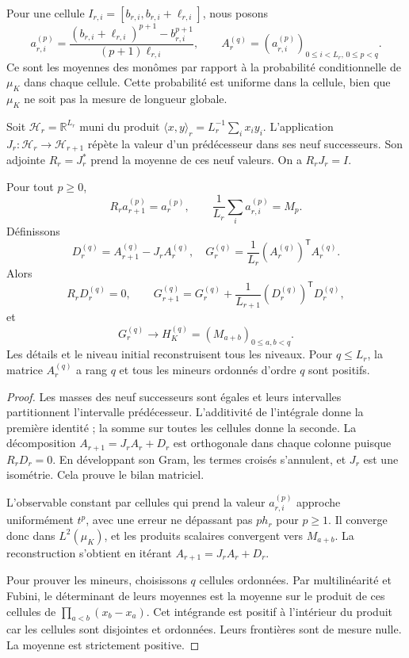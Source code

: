Pour une cellule \(I_{r,i}=[b_{r,i},b_{r,i}+\ell_{r,i}]\), nous posons
\[
 a_{r,i}^{(p)}=
 \frac{(b_{r,i}+\ell_{r,i})^{p+1}-b_{r,i}^{p+1}}
 {(p+1)\ell_{r,i}},\qquad
 A_r^{(q)}=(a_{r,i}^{(p)})_{0\leq i<L_r,\,0\leq p<q}.
\]
Ce sont les moyennes des monômes par rapport à la probabilité conditionnelle
de \(\mu_K\) dans chaque cellule. Cette probabilité est uniforme dans la
cellule, bien que \(\mu_K\) ne soit pas la mesure de longueur globale.

Soit \(\mathcal H_r=\mathbb R^{L_r}\) muni du produit \(\langle x,y\rangle_r=L_r^{-1}\sum_i x_i y_i\). L'application \(J_r:\mathcal H_r\to\mathcal H_{r+1}\) répète la valeur d'un prédécesseur dans ses neuf successeurs. Son adjointe \(R_r=J_r^*\) prend la moyenne de ces neuf valeurs. On a \(R_rJ_r=I\).

\begin{theorem}
\label{thm:dim-cell-balance}
Pour tout \(p\geq0\),
\[
 R_r a_{r+1}^{(p)}=a_r^{(p)},\qquad
 \frac1{L_r}\sum_i a_{r,i}^{(p)}=M_p.
\]
Définissons
\[
 D_r^{(q)}=A_{r+1}^{(q)}-J_rA_r^{(q)},\quad
 G_r^{(q)}=\frac1{L_r}(A_r^{(q)})^{\mathsf T}A_r^{(q)}.
\]
Alors
\[
 R_rD_r^{(q)}=0,\qquad
 G_{r+1}^{(q)}=G_r^{(q)}+
       \frac1{L_{r+1}}(D_r^{(q)})^{\mathsf T}D_r^{(q)},
\]
et
\[
 G_r^{(q)}\longrightarrow H_K^{(q)}=(M_{a+b})_{0\leq a,b<q}.
\]
Les détails et le niveau initial reconstruisent tous les niveaux. Pour
\(q\leq L_r\), la matrice \(A_r^{(q)}\) a rang \(q\) et
tous les mineurs ordonnés d’ordre \(q\) sont positifs.
\end{theorem}
\begin{proof}
Les masses des neuf successeurs sont égales et leurs intervalles partitionnent l'intervalle prédécesseur. L'additivité de l'intégrale donne la première identité ; la somme sur toutes les cellules donne la seconde. La décomposition \(A_{r+1}=J_rA_r+D_r\) est orthogonale dans chaque colonne puisque \(R_rD_r=0\). En développant son Gram, les termes croisés s'annulent, et \(J_r\) est une isométrie. Cela prouve le bilan matriciel.

L'observable constant par cellules qui prend la valeur \(a_{r,i}^{(p)}\) approche uniformément \(t^p\), avec une erreur ne dépassant pas \(p h_r\) pour \(p\geq1\). Il converge donc dans \(L^2(\mu_K)\), et les produits scalaires convergent vers \(M_{a+b}\). La reconstruction s'obtient en itérant \(A_{r+1}=J_rA_r+D_r\).

Pour prouver les mineurs, choisissons \(q\) cellules ordonnées. Par
multilinéarité et Fubini, le déterminant de leurs moyennes est la moyenne
sur le produit de ces cellules de
\(\prod_{a<b}(x_b-x_a)\). Cet intégrande est positif à
l’intérieur du produit car les cellules sont disjointes et ordonnées.
Leurs frontières sont de mesure nulle. La moyenne est strictement positive.
\end{proof}

